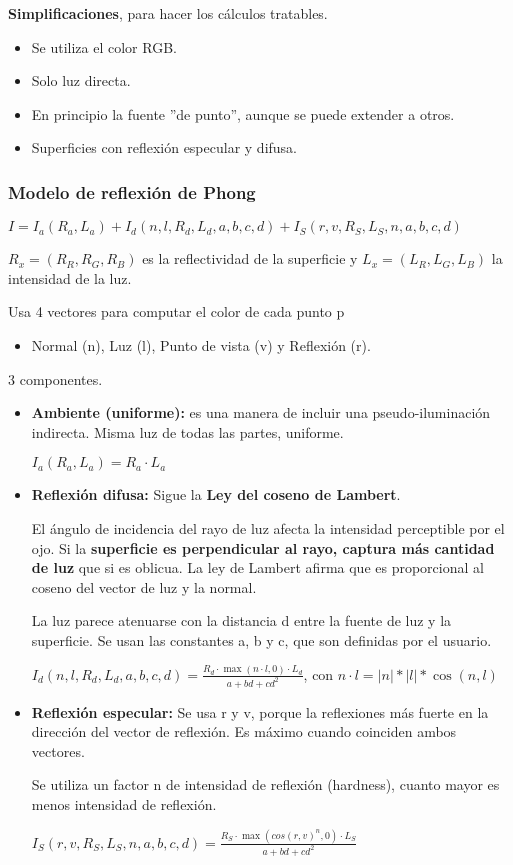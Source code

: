 \textbf{Simplificaciones}, para hacer los cálculos tratables.
\begin{itemize}
    \item Se utiliza el color RGB.
    \item Solo luz directa.
    \item En principio la fuente ''de punto'', aunque se puede extender a otros.
    \item Superficies con reflexión especular y difusa.
\end{itemize}

\subsubsection{Modelo de reflexión de Phong} 
$I=I_a(R_a,L_a)+I_d(n, l, R_d, L_d, a, b, c, d)+I_S(r,v, R_S, L_S, n, a, b, c, d)$

$R_x=(R_R, R_G, R_B)$ es la reflectividad de la superficie y $L_x=(L_R, L_G, L_B)$ la intensidad de la luz.

Usa 4 vectores para computar el color de cada punto p
    \begin{itemize}
        \item Normal (n), Luz (l), Punto de vista (v) y Reflexión (r).
    \end{itemize}

3 componentes. 
    \begin{itemize}
        \item \textbf{Ambiente (uniforme):} es una manera de incluir una pseudo-iluminación indirecta. Misma luz de todas las partes, uniforme. 
        
        $I_a(R_a, L_a)=R_a \cdot L_a$
        \item \textbf{Reflexión difusa:} Sigue la \textbf{Ley del coseno de Lambert}. 
        
        El ángulo de incidencia del rayo de luz afecta la intensidad perceptible por el ojo. Si la \textbf{superficie es perpendicular al rayo, captura más cantidad de luz} que si es oblicua. La ley de Lambert afirma que es proporcional al coseno del vector de luz y la normal. 
        
        La luz parece atenuarse con la distancia d entre la fuente de luz y la superficie. Se usan las constantes a, b y c, que son definidas por el usuario.
        
        $I_d(n, l, R_d, L_d, a, b, c, d)= \frac {R_d \cdot \max (n\cdot l,0) \cdot L_d}{a+bd+cd^2}$, con $n \cdot l = |n|*|l|*\cos(n,l)$
        \item \textbf{Reflexión especular:} Se usa r y v, porque la reflexiones más fuerte en la dirección del vector de reflexión. Es máximo cuando coinciden ambos vectores.
        
        Se utiliza un factor n de intensidad de reflexión (hardness), cuanto mayor es menos intensidad de reflexión.
        
        $I_S(r,v, R_S, L_S, n, a, b, c, d)= \frac {R_S \cdot \max (cos(r,v)^n,0) \cdot L_S}{a+bd+cd^2}$
    \end{itemize}

